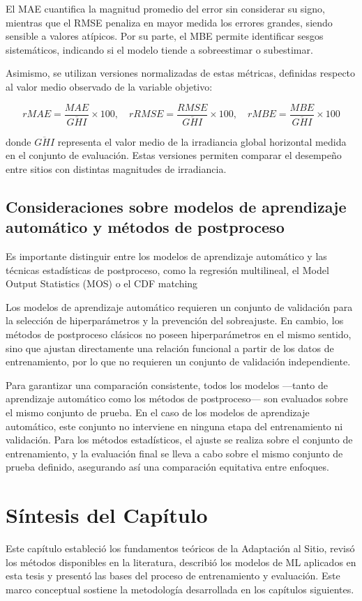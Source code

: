El MAE cuantifica la magnitud promedio del error sin considerar su signo, mientras que el RMSE penaliza en mayor medida los errores grandes, siendo sensible a valores atípicos. Por su parte, el MBE permite identificar sesgos sistemáticos, indicando si el modelo tiende a sobreestimar o subestimar.

Asimismo, se utilizan versiones normalizadas de estas métricas, definidas respecto al valor medio observado de la variable objetivo:

\begin{equation}
rMAE = \frac{MAE}{\overline{GHI}} \times 100, \quad
rRMSE = \frac{RMSE}{\overline{GHI}} \times 100, \quad
rMBE = \frac{MBE}{\overline{GHI}} \times 100
\end{equation}

donde $\overline{GHI}$ representa el valor medio de la irradiancia global horizontal medida en el conjunto de evaluación. Estas versiones permiten comparar el desempeño entre sitios con distintas magnitudes de irradiancia.

\subsection*{Consideraciones sobre modelos de aprendizaje automático y métodos de postproceso}

Es importante distinguir entre los modelos de aprendizaje automático y las técnicas estadísticas de postproceso, como la regresión multilineal, el Model Output Statistics (MOS) o el CDF matching

Los modelos de aprendizaje automático requieren un conjunto de validación para la selección de hiperparámetros y la prevención del sobreajuste. En cambio, los métodos de postproceso clásicos no poseen hiperparámetros en el mismo sentido, sino que ajustan directamente una relación funcional a partir de los datos de entrenamiento, por lo que no requieren un conjunto de validación independiente.

Para garantizar una comparación consistente, todos los modelos —tanto de aprendizaje automático como los métodos de postproceso— son evaluados sobre el mismo conjunto de prueba. En el caso de los modelos de aprendizaje automático, este conjunto no interviene en ninguna etapa del entrenamiento ni validación. Para los métodos estadísticos, el ajuste se realiza sobre el conjunto de entrenamiento, y la evaluación final se lleva a cabo sobre el mismo conjunto de prueba definido, asegurando así una comparación equitativa entre enfoques.


\section{Síntesis del Capítulo}
Este capítulo estableció los fundamentos teóricos de la Adaptación al Sitio, revisó los métodos disponibles en la literatura, describió los modelos de ML aplicados en esta tesis y presentó las bases del proceso de entrenamiento y evaluación. Este marco conceptual sostiene la metodología desarrollada en los capítulos siguientes.

